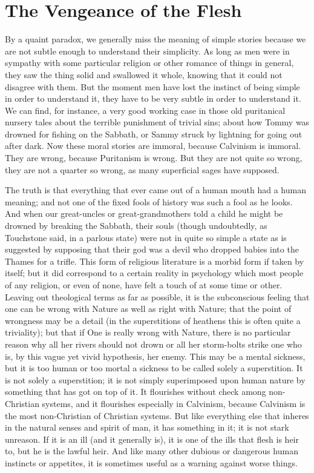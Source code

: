 \documentclass{book}
\begin{document}
\chapter{The Vengeance of the Flesh}
\label{chapter-14}
By a quaint paradox, we generally miss the meaning of simple stories because we are not subtle enough to understand their simplicity. As long as men were in sympathy with some particular religion or other romance of things in general, they saw the thing solid and swallowed it whole, knowing that it could not disagree with them. But the moment men have lost the instinct of being simple in order to understand it, they have to be very subtle in order to understand it. We can find, for instance, a very good working case in those old puritanical nursery tales about the terrible punishment of trivial sins; about how Tommy was drowned for fishing on the Sabbath, or Sammy struck by lightning for going out after dark. Now these moral stories are immoral, because Calvinism is immoral. They are wrong, because Puritanism is wrong. But they are not quite so wrong, they are not a quarter so wrong, as many superficial sages have supposed.

The truth is that everything that ever came out of a human mouth had a human meaning; and not one of the fixed fools of history was such a fool as he looks. And when our great-uncles or great-grandmothers told a child he might be drowned by breaking the Sabbath, their souls (though undoubtedly, as Touchstone said, in a parlous state) were not in quite so simple a state as is suggested by supposing that their god was a devil who dropped babies into the Thames for a trifle. This form of religious literature is a morbid form if taken by itself; but it did correspond to a certain reality in psychology which most people of any religion, or even of none, have felt a touch of at some time or other. Leaving out theological terms as far as possible, it is the subconscious feeling that one can be wrong with Nature as well as right with Nature; that the point of wrongness may be a detail (in the superstitions of heathens this is often quite a triviality); but that if One is really wrong with Nature, there is no particular reason why all her rivers should not drown or all her storm-bolts strike one who is, by this vague yet vivid hypothesis, her enemy. This may be a mental sickness, but it is too human or too mortal a sickness to be called solely a superstition. It is not solely a superstition; it is not simply superimposed upon human nature by something that has got on top of it. It flourishes without check among non-Christian systems, and it flourishes especially in Calvinism, because Calvinism is the most non-Christian of Christian systems. But like everything else that inheres in the natural senses and spirit of man, it has something in it; it is not stark unreason. If it is an ill (and it generally is), it is one of the ills that flesh is heir to, but he is the lawful heir. And like many other dubious or dangerous human instincts or appetites, it is sometimes useful as a warning against worse things.
\end{document}
